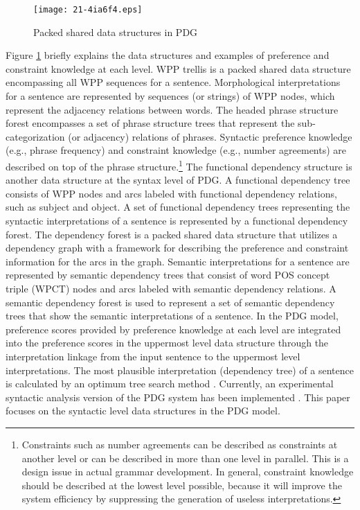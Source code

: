 \documentclass[english]{jnlp_1.4_rep}
\theoremstyle{break}
\theoremstyle{plain}
\theoremstyle{plain}
\begin{document}
\begin{figure}[t]
 \begin{center}
\texttt{[image: 21-4ia6f4.eps]}
 \end{center}
\caption{Packed shared data structures in PDG}
\label{fig:PDGPackedSharedDataStructures}
\end{figure}

Figure \ref{fig:PDGPackedSharedDataStructures} briefly explains the data
structures and examples of preference and constraint knowledge at
each level.  WPP trellis is a packed shared data structure
encompassing all WPP sequences for a sentence. Morphological
interpretations for a sentence are represented by \mbox{sequences} (or
strings) of WPP nodes, which represent the adjacency relations between
words.  The headed phrase structure forest encompasses a set of phrase
structure trees that represent the sub-categorization (or adjacency)
relations of phrases. Syntactic preference knowledge (e.g., phrase
frequency) and constraint knowledge (e.g., number agreements) are
described on top of the phrase structure.\footnote{Constraints such as
number agreements can be described as constraints at another
level or can be described in more than one level in parallel. This is
a design issue in actual grammar development. In general, constraint
knowledge should be described at the lowest level possible, because it
will improve the system efficiency by suppressing the generation of
useless interpretations.} The functional dependency structure is
another data structure at the syntax level of PDG. A functional
dependency tree consists of WPP nodes and arcs labeled with functional
dependency relations, such as subject and object. A set of functional
dependency trees representing the syntactic interpretations of a
sentence is represented by a functional dependency forest. The
dependency forest is a packed shared data structure that utilizes a
dependency graph with a framework for describing the preference and
constraint information for the arcs in the graph. Semantic
interpretations for a sentence are represented by semantic dependency
trees that consist of word POS concept triple (WPCT) nodes and arcs
labeled with semantic dependency relations. A semantic dependency
forest is used to represent a set of semantic dependency trees that
show the semantic interpretations of a sentence. In the PDG model,
preference scores provided by preference knowledge at each level are
integrated into the preference scores in the uppermost level data
structure through the interpretation linkage from the input sentence
to the uppermost level interpretations. The most plausible
interpretation (dependency tree) of a sentence is calculated by an
optimum tree search method \cite{Hirakawa05d_e}. Currently, an
experimental syntactic analysis version of the PDG system has been
implemented \cite{Hirakawa07}. This paper focuses on the syntactic
level data structures in the PDG model.
\end{document}
